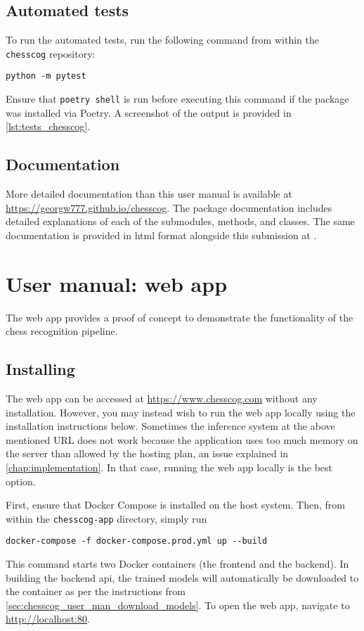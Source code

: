 \documentclass[../../report.tex]{subfiles}
\begin{document}
\section{Automated tests}
\label{sec:chesscog_tests}
To run the automated tests, run the following command from within the \texttt{chesscog} repository:
\begin{verbatim}
python -m pytest
\end{verbatim}
Ensure that \texttt{poetry shell} is run before executing this command if the package was installed via Poetry.
A screenshot of the output is provided in \cref{lst:tests_chesscog}.

\section{Documentation}
\label{sec:chesscog_documentation}
More detailed documentation than this user manual is available at \url{https://georgw777.github.io/chesscog}.
The package documentation includes detailed explanations of each of the submodules, methods, and classes.
The same documentation is provided in \gls{html} format alongside this submission at .

\chapter{User manual: web app}
\label{chap:user_man_chesscogapp}

The web app provides a proof of concept to demonstrate the functionality of the chess recognition pipeline.

\section{Installing}
The web app can be accessed at \url{https://www.chesscog.com} without any installation.
However, you may instead wish to run the web app locally using the installation instructions below.
Sometimes the inference system at the above mentioned URL does not work because the application uses too much memory on the server than allowed by the hosting plan, an issue explained in \cref{chap:implementation}.
In that case, running the web app locally is the best option.

First, ensure that Docker Compose is installed on the host system.
Then, from within the \texttt{chesscog-app} directory, simply run
\begin{verbatim}
docker-compose -f docker-compose.prod.yml up --build
\end{verbatim}
This command starts two Docker containers (the frontend and the backend).
In building the backend \gls{api}, the trained models will automatically be downloaded to the container as per the instructions from \cref{sec:chesscog_user_man_download_models}.
To open the web app, navigate to \url{http://localhost:80}.
\end{document}
